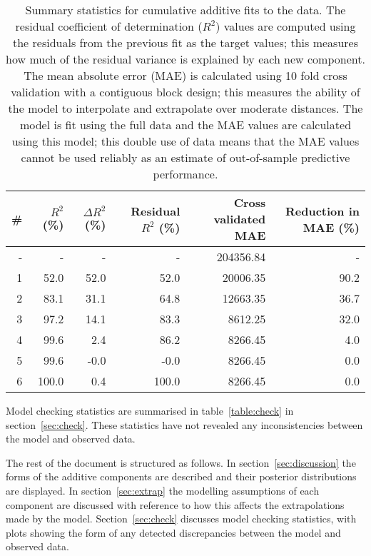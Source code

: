 \documentclass{article} %
\begin{document}
\begin{table}[htb]
\begin{center}
{\small
\begin{tabular}{|r|rrrrr|}
\hline
\bf{\#} & {$R^2$ (\%)} & {$\Delta R^2$ (\%)} & {Residual $R^2$ (\%)} & {Cross validated MAE} & Reduction in MAE (\%)\\
\hline
- & - & - & - & 204356.84 & -\\

1 & 52.0 & 52.0 & 52.0 & 20006.35 & 90.2\\

2 & 83.1 & 31.1 & 64.8 & 12663.35 & 36.7\\

3 & 97.2 & 14.1 & 83.3 & 8612.25 & 32.0\\

4 & 99.6 & 2.4 & 86.2 & 8266.45 & 4.0\\

5 & 99.6 & -0.0 & -0.0 & 8266.45 & 0.0\\

6 & 100.0 & 0.4 & 100.0 & 8266.45 & 0.0\\

\hline
\end{tabular}
\caption{
Summary statistics for cumulative additive fits to the data.
The residual coefficient of determination ($R^2$) values are computed using the residuals from the previous fit as the target values; this measures how much of the residual variance is explained by each new component.
The mean absolute error (MAE) is calculated using 10 fold cross validation with a contiguous block design; this measures the ability of the model to interpolate and extrapolate over moderate distances.
The model is fit using the full data and the MAE values are calculated using this model; this double use of data means that the MAE values cannot be used reliably as an estimate of out-of-sample predictive performance.
}
\label{table:stats}
}
\end{center}
\end{table}

Model checking statistics are summarised in table~\ref{table:check} in section~\ref{sec:check}.
These statistics have not revealed any inconsistencies between the model and observed data.

The rest of the document is structured as follows.
In section~\ref{sec:discussion} the forms of the additive components are described and their posterior distributions are displayed.
In section~\ref{sec:extrap} the modelling assumptions of each component are discussed with reference to how this affects the extrapolations made by the model.
Section~\ref{sec:check} discusses model checking statistics, with plots showing the form of any detected discrepancies between the model and observed data.
\end{document}
